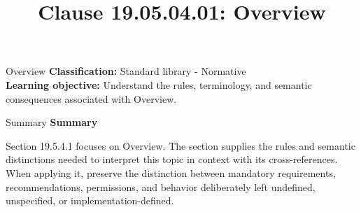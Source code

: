 \documentclass[10pt,letterpaper]{article}
\title{Clause 19.05.04.01: Overview}
\author{}
\date{}
\begin{document}
\maketitle
\begin{CornellOverviewBox}{Overview}
\textbf{Classification:} Standard library - Normative\\[2pt]
\textbf{Learning objective:} Understand the rules, terminology, and semantic consequences associated with Overview.
\end{CornellOverviewBox}\begin{CornellSummaryBox}{Summary}
{\sffamily\bfseries\color{Accent} Summary}\par\vspace{3pt}Section 19.5.4.1 focuses on Overview. The section supplies the rules and semantic distinctions needed to interpret this topic in context with its cross-references. When applying it, preserve the distinction between mandatory requirements, recommendations, permissions, and behavior deliberately left undefined, unspecified, or implementation-defined.
\end{CornellSummaryBox}
\end{document}
